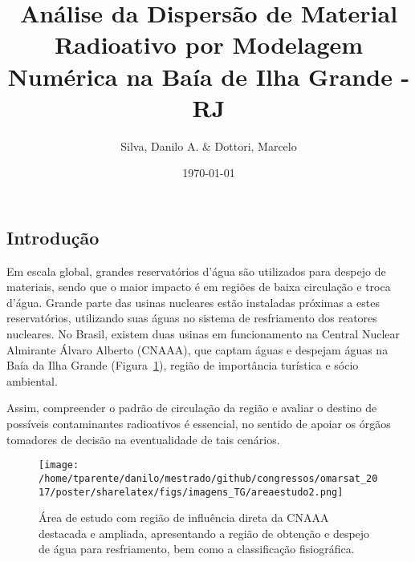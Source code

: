 \documentclass[final]{beamer}
\title
[24$^{o}$ Simpósio Internacional de Iniciação Científica da USP] %
{ %
Análise da Dispersão de Material Radioativo por Modelagem Numérica na Baía de Ilha Grande - RJ
}
\author{ Silva, Danilo A.\inst{1} $\&$ Dottori, Marcelo\inst{2}
}
\institute[Instituto Oceanográfico - Universidade de São Paulo]
{
Instituto Oceanográfico da Universidade de São Paulo (IOUSP)\\ [0.2ex]
\inst{1} danilo2.silva@usp.br; \inst{2} mdottori@usp.br
}
\date{\today}
\begin{document}
\begin{frame}
\begin{multicols}{2}

\section{Introdução}

Em escala global, grandes reservatórios d'água são utilizados para despejo de materiais,
sendo que o maior impacto é em regiões de baixa circulação e troca d'água. Grande
parte das usinas nucleares estão instaladas próximas a estes reservatórios, utilizando
suas águas no sistema de resfriamento dos reatores nucleares. No Brasil, existem
duas usinas em funcionamento na Central Nuclear Almirante Álvaro Alberto (CNAAA),
que captam águas e despejam águas na Baía da Ilha Grande (Figura~\ref{fig:areaestudo}),
região de importância turística e sócio ambiental.

Assim, compreender o padrão de circulação da região e avaliar o destino de possíveis
contaminantes radioativos é essencial, no sentido de apoiar os órgãos tomadores de decisão na
eventualidade de tais cenários.


\vspace{.1in}
\begin{figure}
\centering
\texttt{[image: /home/tparente/danilo/mestrado/github/congressos/omarsat\_2017/poster/sharelatex/figs/imagens\_TG/areaestudo2.png]}
\vspace{.1in}
\caption{Área de estudo com região de influência direta da CNAAA destacada e ampliada, apresentando a região de obtenção e despejo de água para resfriamento, bem como a classificação fisiográfica.}
\label{fig:areaestudo}
\end{figure}
\vspace{-.5in}


\end{multicols}
\end{frame}
\end{document}
